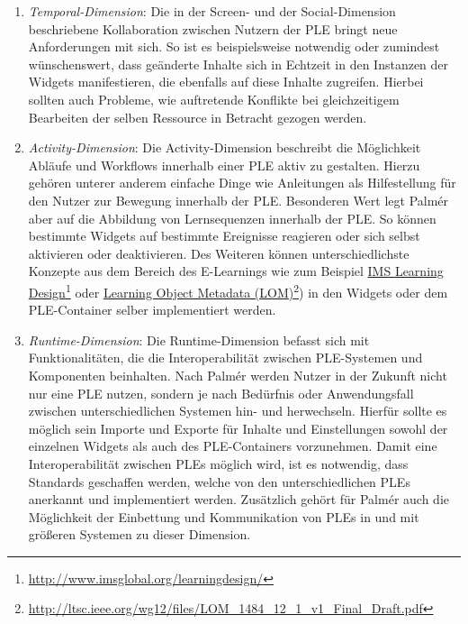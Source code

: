 \begin{enumerate}
 \item \emph{Temporal-Dimension}: Die in der Screen- und der Social-Dimension beschriebene Kollaboration zwischen Nutzern der PLE bringt neue Anforderungen mit sich. So ist es beispielsweise notwendig oder zumindest wünschenswert, dass geänderte Inhalte sich in Echtzeit in den Instanzen der Widgets manifestieren, die ebenfalls auf diese Inhalte zugreifen. Hierbei sollten auch Probleme, wie auftretende Konflikte bei gleichzeitigem Bearbeiten der selben Ressource in Betracht gezogen werden.
 \item \emph{Activity-Dimension}: Die Activity-Dimension beschreibt die Möglichkeit Abläufe und Workflows innerhalb einer PLE aktiv zu gestalten. Hierzu gehören unterer anderem einfache Dinge wie Anleitungen als Hilfestellung für den Nutzer zur Bewegung innerhalb der PLE. Besonderen Wert legt Palmér aber auf die Abbildung von Lernsequenzen innerhalb der PLE. So können bestimmte Widgets auf bestimmte Ereignisse reagieren oder sich selbst aktivieren oder deaktivieren. Des Weiteren können unterschiedlichste Konzepte aus dem Bereich des E-Learnings wie zum Beispiel \href{http://www.imsglobal.org/learningdesign/}{IMS Learning Design}\footnote{\url{http://www.imsglobal.org/learningdesign/}} oder \href{http://ltsc.ieee.org/wg12/files/LOM_1484_12_1_v1_Final_Draft.pdf}{Learning Object Metadata (LOM)}\footnote{\url{http://ltsc.ieee.org/wg12/files/LOM_1484_12_1_v1_Final_Draft.pdf}}) in den Widgets oder dem PLE-Container selber implementiert werden.
 \item \emph{Runtime-Dimension}: Die Runtime-Dimension befasst sich mit Funktionalitäten, die die Interoperabilität zwischen PLE-Systemen und Komponenten beinhalten. Nach Palmér werden Nutzer in der Zukunft nicht nur eine PLE nutzen, sondern je nach Bedürfnis oder Anwendungsfall zwischen unterschiedlichen Systemen hin- und herwechseln. Hierfür sollte es möglich sein Importe und Exporte für Inhalte und Einstellungen sowohl der einzelnen Widgets als auch des PLE-Containers vorzunehmen. Damit eine Interoperabilität
 zwischen PLEs möglich wird, ist es notwendig, dass Standards geschaffen werden, welche von den unterschiedlichen PLEs anerkannt und implementiert werden. Zusätzlich gehört für Palmér auch die Möglichkeit der Einbettung und Kommunikation von PLEs in und mit größeren Systemen zu dieser Dimension.
\end{enumerate}

